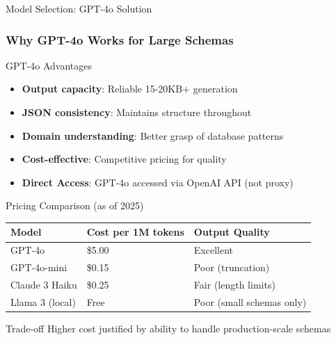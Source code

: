 \documentclass{beamer}
\begin{document}
\begin{frame}{Model Selection: GPT-4o Solution}
\frametitle{Why GPT-4o Works for Large Schemas}

\begin{block}{GPT-4o Advantages}
\begin{itemize}
    \item \textbf{Output capacity}: Reliable 15-20KB+ generation
    \item \textbf{JSON consistency}: Maintains structure throughout
    \item \textbf{Domain understanding}: Better grasp of database patterns
    \item \textbf{Cost-effective}: Competitive pricing for quality
    \item \textbf{Direct Access}: GPT-4o accessed via OpenAI API (not proxy)
\end{itemize}
\end{block}

\begin{exampleblock}{Pricing Comparison (as of 2025)}
\begin{tabular}{lll}
\toprule
Model & Cost per 1M tokens & Output Quality \\
\midrule
GPT-4o & \$5.00 & Excellent \\
GPT-4o-mini & \$0.15 & Poor (truncation) \\
Claude 3 Haiku & \$0.25 & Fair (length limits) \\
Llama 3 (local) & Free & Poor (small schemas only) \\
\bottomrule
\end{tabular}
\end{exampleblock}

\begin{alertblock}{Trade-off}
Higher cost justified by ability to handle production-scale schemas
\end{alertblock}

\end{frame}
\end{document}
